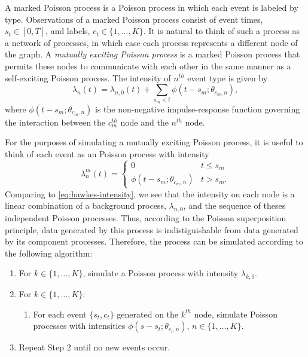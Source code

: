 A marked Poisson process is a Poisson process in which each event is labeled by type. Observations of a marked Poisson process consist of event times, $s_t \in [0, T]$, and labels, $c_t \in \{1, \dots, K\}$. It is natural to think of such a process as a network of processes, in which case each process represents a different node of the graph. A \textit{mutually exciting Poisson process} is a marked Poisson process that permits these nodes to communicate with each other in the same manner as a self-exciting Poisson process. The intensity of $n^{th}$ event type is given by
%
\begin{equation} \label{eq:hawkes-intensity}
	\lambda_{n}(t) = \lambda_{n, 0}(t) + \sum_{s_m < t} \phi(t - s_m; \theta_{c_m, n}),
\end{equation}
%
where $\phi(t - s_m; \theta_{c_m, n})$ is the non-negative impulse-response function governing the interaction between the $c_m^{th}$ node and the $n^{th}$ node.

For the purposes of simulating a mutually exciting Poisson process, it is useful to think of each event as an Poisson process with intensity
%
\begin{equation}
	\lambda_n^m(t) = \begin{cases}
				          0 & t \le s_m \\
				          \phi(t - s_m; \theta_{c_m, n}) & t > s_m.
				      \end{cases}
\end{equation}
%
Comparing to \eqref{eq:hawkes-intensity}, we see that the intensity on each node is a linear combination of a background process, $\lambda_{n,0}$, and the sequence of theses independent Poisson processes. Thus, according to the Poisson superposition principle, data generated by this process is indistiguishable from data generated by its component processes. Therefore, the process can be simulated according to the following algorithm:
\begin{enumerate}
	\item For $k \in \{1, \dots, K\}$, simulate a Poisson process with intensity $\lambda_{k,0}$.
  \item For $k \in \{1, \dots, K\}$:
    \begin{enumerate}
      \item For each event $\{s_t, c_t\}$ generated on the $k^{th}$ node, simulate Poisson processes with intensities $\phi(s - s_t; \theta_{c_t, n})$, $n \in \{1, \dots, K\}$.
    \end{enumerate}
  \item Repeat Step 2 until no new events occur.
\end{enumerate}

